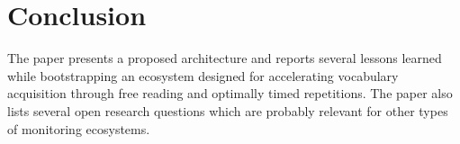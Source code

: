 
\section{Conclusion}

The paper presents a proposed architecture and reports
several lessons learned while bootstrapping an ecosystem designed for accelerating vocabulary acquisition through free reading and optimally timed repetitions.
The paper also lists several open research questions which are probably relevant for other types of monitoring ecosystems. 

